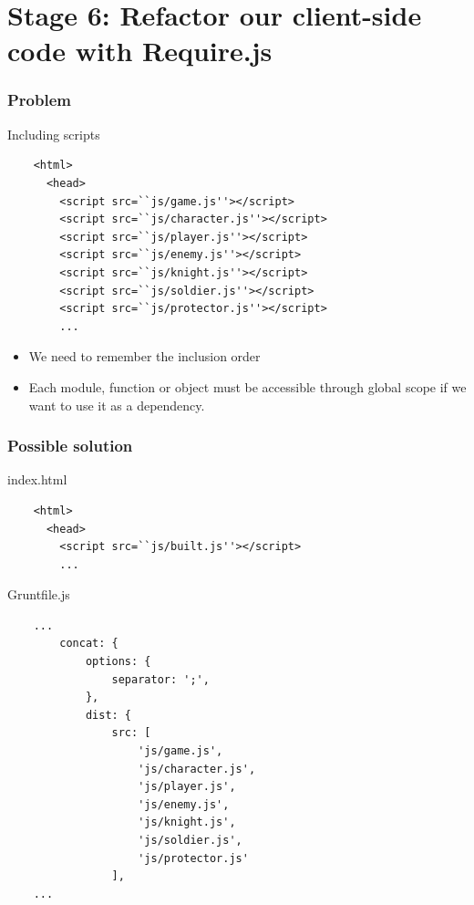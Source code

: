 \section{Stage 6: Refactor our client-side code with Require.js}

\begin{frame}[fragile]
  \frametitle{Problem}

  \begin{block}{Including scripts}
    {\scriptsize
    \begin{verbatim}
    <html>
      <head>
        <script src=``js/game.js''></script>
        <script src=``js/character.js''></script>
        <script src=``js/player.js''></script>
        <script src=``js/enemy.js''></script>
        <script src=``js/knight.js''></script>
        <script src=``js/soldier.js''></script>
        <script src=``js/protector.js''></script>
        ...
    \end{verbatim}
    }
  \end{block}

  \pause
  
  \begin{itemize}
    \item We need to remember the inclusion order 
    \item Each module, function or object must be accessible through global scope if we want to use it as a dependency.
  \end{itemize}
\end{frame}

\begin{frame}[fragile]
  \frametitle{Possible solution}

  \begin{block}{index.html}
    {\tiny
    \begin{verbatim}
    <html>
      <head>
        <script src=``js/built.js''></script>
        ...
    \end{verbatim}
    }
  \end{block}

  \begin{block}{Gruntfile.js}
    {\tiny
    \begin{verbatim}
    ...
        concat: {
            options: {
                separator: ';',
            },
            dist: {
                src: [
                    'js/game.js',
                    'js/character.js',
                    'js/player.js',
                    'js/enemy.js',
                    'js/knight.js',
                    'js/soldier.js',
                    'js/protector.js'
                ],
    ...
    \end{verbatim}
    }
  \end{block}
\end{frame}

